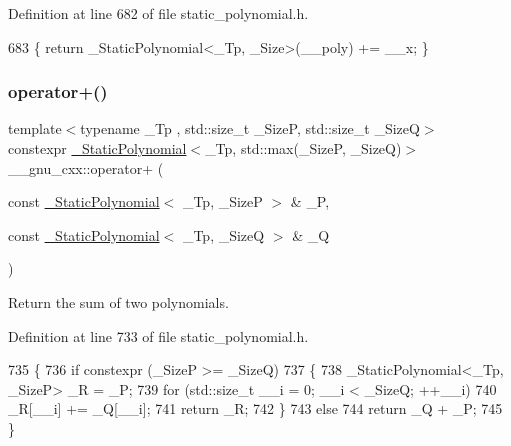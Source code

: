 Definition at line 682 of file static\+\_\+polynomial.\+h.


\begin{DoxyCode}
683     \{ \textcolor{keywordflow}{return} \_StaticPolynomial<\_Tp, \_Size>(\_\_poly) += \_\_x; \}
\end{DoxyCode}
\mbox{\label{namespace____gnu__cxx_ab21b8f613598d3de78239f9a5d45bee7}} 
\subsubsection{\texorpdfstring{operator+()}{operator+()}\hspace{0.1cm}{\footnotesize\ttfamily [3/6]}}
{\footnotesize\ttfamily template$<$typename \+\_\+\+Tp , std\+::size\+\_\+t \+\_\+\+SizeP, std\+::size\+\_\+t \+\_\+\+SizeQ$>$ \\
constexpr \hyperlink{class____gnu__cxx_1_1__StaticPolynomial}{\+\_\+\+Static\+Polynomial}$<$\+\_\+\+Tp, std\+::max(\+\_\+\+SizeP, \+\_\+\+SizeQ)$>$ \+\_\+\+\_\+gnu\+\_\+cxx\+::operator+ (\begin{DoxyParamCaption}\item[{const \hyperlink{class____gnu__cxx_1_1__StaticPolynomial}{\+\_\+\+Static\+Polynomial}$<$ \+\_\+\+Tp, \+\_\+\+SizeP $>$ \&}]{\+\_\+P,  }\item[{const \hyperlink{class____gnu__cxx_1_1__StaticPolynomial}{\+\_\+\+Static\+Polynomial}$<$ \+\_\+\+Tp, \+\_\+\+SizeQ $>$ \&}]{\+\_\+Q }\end{DoxyParamCaption})\hspace{0.3cm}{\ttfamily [inline]}}

Return the sum of two polynomials. 

Definition at line 733 of file static\+\_\+polynomial.\+h.


\begin{DoxyCode}
735     \{
736       \textcolor{keywordflow}{if} constexpr (\_SizeP >= \_SizeQ)
737         \{
738           \_StaticPolynomial<\_Tp, \_SizeP> \_R = \_P;
739           \textcolor{keywordflow}{for} (std::size\_t \_\_i = 0; \_\_i < \_SizeQ; ++\_\_i)
740             \_R[\_\_i] += \_Q[\_\_i];
741           \textcolor{keywordflow}{return} \_R;
742         \}
743       \textcolor{keywordflow}{else}
744         \textcolor{keywordflow}{return} \_Q + \_P;
745     \}
\end{DoxyCode}
\mbox{\label{namespace____gnu__cxx_a2b408e7a7e5d2ec6879b8e40f7f5de3e}} 
